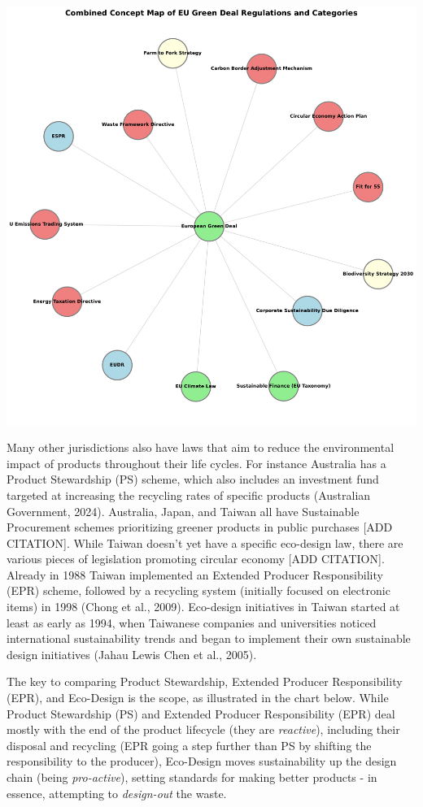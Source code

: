 \documentclass[
  letterpaper,
  DIV=11,
  numbers=noendperiod]{scrartcl}
\begin{document}
\includegraphics{_thesis_files/figure-pdf/cell-23-output-1.pdf}

Many other jurisdictions also have laws that aim to reduce the
environmental impact of products throughout their life cycles. For
instance Australia has a Product Stewardship (PS) scheme, which also
includes an investment fund targeted at increasing the recycling rates
of specific products (Australian Government, 2024). Australia, Japan,
and Taiwan all have Sustainable Procurement schemes prioritizing greener
products in public purchases {[}ADD CITATION{]}. While Taiwan doesn't
yet have a specific eco-design law, there are various pieces of
legislation promoting circular economy {[}ADD CITATION{]}. Already in
1988 Taiwan implemented an Extended Producer Responsibility (EPR)
scheme, followed by a recycling system (initially focused on electronic
items) in 1998 (Chong et al., 2009). Eco-design initiatives in Taiwan
started at least as early as 1994, when Taiwanese companies and
universities noticed international sustainability trends and began to
implement their own sustainable design initiatives (Jahau Lewis Chen et
al., 2005).

The key to comparing Product Stewardship, Extended Producer
Responsibility (EPR), and Eco-Design is the scope, as illustrated in the
chart below. While Product Stewardship (PS) and Extended Producer
Responsibility (EPR) deal mostly with the end of the product lifecycle
(they are \emph{reactive}), including their disposal and recycling (EPR
going a step further than PS by shifting the responsibility to the
producer), Eco-Design moves sustainability up the design chain (being
\emph{pro-active}), setting standards for making better products - in
essence, attempting to \emph{design-out} the waste.
\end{document}
